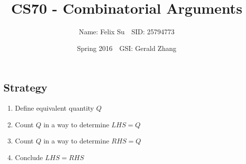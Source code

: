\documentclass{article}\usepackage{amsmath,amssymb,amsthm,tikz,tkz-graph,color,chngpage,soul,hyperref,csquotes,graphicx,floatrow, listings}\newcommand*{\QEDB}{\hfill\ensuremath{\square}}\newtheorem*{prop}{Proposition}\renewcommand{\theenumi}{\alph{enumi}}\usepackage[shortlabels]{enumitem}\usepackage[nobreak=true]{mdframed}\usetikzlibrary{matrix,calc}\MakeOuterQuote{"}\usepackage[margin=0.75in]{geometry} \newtheorem{theorem}{Theorem}\newcommand{\Z}{\mathbb Z}\newcommand{\R}{\mathbb R}\newcommand{\Q}{\mathbb Q}\newcommand{\N}{\mathbb N}\newcommand{\x}[1]{\textrm{ #1 }}\newcommand{\pr}{\textrm{Pr}}
\title{CS70 - Combinatorial Arguments}
\author{Name: Felix Su$\quad$SID: 25794773}
\date{Spring 2016$\quad$GSI: Gerald Zhang}
\begin{document}
\maketitle

\subsection*{Strategy}
\begin{enumerate}[1.]
    \item Define equivalent quantity $Q$
    \item Count $Q$ in a way to determine $LHS=Q$
    \item Count $Q$ in a way to determine $RHS=Q$
    \item Conclude $LHS=RHS$
\end{enumerate}
\end{document}
